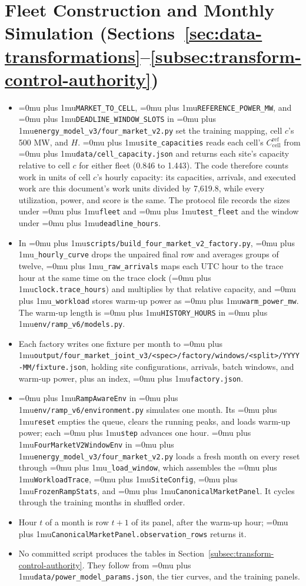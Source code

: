 \documentclass{UNCC-thesis}
\newcommand{\codepath}[1]{{\Urlmuskip=0mu plus 1mu\relax\nolinkurl{#1}}}
\begin{document}
\section{Fleet Construction and Monthly Simulation
  (Sections~\ref{sec:data-transformations}--\ref{subsec:transform-control-authority})}
\begin{itemize}
  \item \codepath{MARKET_TO_CELL}, \codepath{REFERENCE_POWER_MW}, and
        \codepath{DEADLINE_WINDOW_SLOTS} in
        \codepath{energy_model_v3/four_market_v2.py} set the training
        mapping, cell \(c\)'s 500 MW, and \(H\). \codepath{site_capacities}
        reads each cell's \(C^{\mathrm{ref}}_{\mathrm{cell}}\) from
        \codepath{data/cell_capacity.json} and returns each site's capacity
        relative to cell \(c\) for either fleet (0.846 to 1.443). The code
        therefore counts work in units of cell \(c\)'s hourly capacity: its
        capacities, arrivals, and executed work are this document's work
        units divided by 7,619.8, while every utilization, power, and score
        is the same. The protocol file records the sizes
        under \codepath{fleet} and \codepath{test_fleet} and the window under
        \codepath{deadline_hours}.
  \item In \codepath{scripts/build_four_market_v2_factory.py},
        \codepath{_hourly_curve} drops the unpaired final row and averages
        groups of twelve, \codepath{_raw_arrivals} maps each UTC hour to the
        trace hour at the same time on the trace clock
        (\codepath{clock.trace_hours}) and multiplies by
        that relative capacity, and \codepath{_workload}
        stores warm-up power as \codepath{warm_power_mw}. The warm-up length is
        \codepath{HISTORY_HOURS} in \codepath{env/ramp_v6/models.py}.
  \item Each factory writes one fixture per month to
        \codepath{output/four_market_joint_v3/<spec>/factory/windows/<split>/YYYY-MM/fixture.json},
        holding site configurations, arrivals, batch windows, and warm-up
        power, plus an index, \codepath{factory.json}.
  \item \codepath{RampAwareEnv} in \codepath{env/ramp_v6/environment.py}
        simulates one month. Its \codepath{reset} empties the queue, clears the
        running peaks, and loads warm-up power; each \codepath{step} advances
        one hour. \codepath{FourMarketV2WindowEnv} in
        \codepath{energy_model_v3/four_market_v2.py} loads a fresh month on
        every reset through \codepath{_load_window}, which assembles the
        \codepath{WorkloadTrace}, \codepath{SiteConfig},
        \codepath{FrozenRampStats}, and \codepath{CanonicalMarketPanel}. It
        cycles through the training months in shuffled order.
  \item Hour \(t\) of a month is row \(t+1\) of its panel, after the warm-up
        hour; \codepath{CanonicalMarketPanel.observation_rows} returns it.
  \item No committed script produces the tables in
        Section~\ref{subsec:transform-control-authority}. They follow from
        \codepath{data/power_model_params.json}, the tier curves, and the
        training panels.
\end{itemize}
\end{document}
